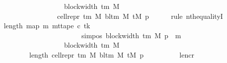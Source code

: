 \begin{isabellebody}
\ \ \ \ \ \ \ \ \ \ \ \ \ \ \ \ \ \ \ \ \ \ \ \ \ {\isacharbrackleft}{\kern0pt}{}{\isachardot}{\kern0pt}{\isachardot}{\kern0pt}{\isacharless}{\kern0pt}block{\isacharunderscore}{\kern0pt}width\ {\isacharparenleft}{\kern0pt}{\isasymGamma}{\isacharunderscore}{\kern0pt}tm\ M{\isacharparenright}{\kern0pt}{\isacharbrackright}{\kern0pt}\isanewline
\ \ \ \ \ \ \ \ \ \ \ \ \ \ \ \ \ \ \ \ \ \ {\isacharequal}{\kern0pt}\ cell{\isacharunderscore}{\kern0pt}repr\ {\isacharparenleft}{\kern0pt}{\isasymGamma}{\isacharunderscore}{\kern0pt}tm\ M{\isacharparenright}{\kern0pt}\ {\isacharparenleft}{\kern0pt}bl{\isacharunderscore}{\kern0pt}tm\ M{\isacharparenright}{\kern0pt}\ {\isacharparenleft}{\kern0pt}tM\ p{\isacharparenright}{\kern0pt}{\isachardoublequoteclose}\isanewline
\ \ \ \ \isamarkupfalse%
\ {\isacharparenleft}{\kern0pt}rule\ nth{\isacharunderscore}{\kern0pt}equalityI{\isacharparenright}{\kern0pt}\isanewline
\ \ \ \ \ \ \isamarkupfalse%
\ {\isachardoublequoteopen}length\ {\isacharparenleft}{\kern0pt}map\ {\isacharparenleft}{\kern0pt}{\isasymlambda}m{\isachardot}{\kern0pt}\ mt{\isacharunderscore}{\kern0pt}tape\ c{\isacharprime}{\kern0pt}\ tk\isanewline
\ \ \ \ \ \ \ \ \ \ \ \ \ \ \ \ \ \ \ \ \ \ \ \ \ \ \ \ \ \ {\isacharparenleft}{\kern0pt}sim{\isacharunderscore}{\kern0pt}pos\ {\isacharparenleft}{\kern0pt}block{\isacharunderscore}{\kern0pt}width\ {\isacharparenleft}{\kern0pt}{\isasymGamma}{\isacharunderscore}{\kern0pt}tm\ M{\isacharparenright}{\kern0pt}{\isacharparenright}{\kern0pt}\ p\ {\isacharplus}{\kern0pt}\ m{\isacharparenright}{\kern0pt}{\isacharparenright}{\kern0pt}\isanewline
\ \ \ \ \ \ \ \ \ \ \ \ \ \ \ \ \ \ \ \ \ \ \ \ \ {\isacharbrackleft}{\kern0pt}{}{\isachardot}{\kern0pt}{\isachardot}{\kern0pt}{\isacharless}{\kern0pt}block{\isacharunderscore}{\kern0pt}width\ {\isacharparenleft}{\kern0pt}{\isasymGamma}{\isacharunderscore}{\kern0pt}tm\ M{\isacharparenright}{\kern0pt}{\isacharbrackright}{\kern0pt}{\isacharparenright}{\kern0pt}\isanewline
\ \ \ \ \ \ \ \ \ \ \ \ \ \ {\isacharequal}{\kern0pt}\ length\ {\isacharparenleft}{\kern0pt}cell{\isacharunderscore}{\kern0pt}repr\ {\isacharparenleft}{\kern0pt}{\isasymGamma}{\isacharunderscore}{\kern0pt}tm\ M{\isacharparenright}{\kern0pt}\ {\isacharparenleft}{\kern0pt}bl{\isacharunderscore}{\kern0pt}tm\ M{\isacharparenright}{\kern0pt}\ {\isacharparenleft}{\kern0pt}tM\ p{\isacharparenright}{\kern0pt}{\isacharparenright}{\kern0pt}{\isachardoublequoteclose}\isanewline
\ \ \ \ \ \ \ \ \isamarkupfalse%
\ len{\isacharunderscore}{\kern0pt}cr\ \isamarkupfalse%

\end{isabellebody}
